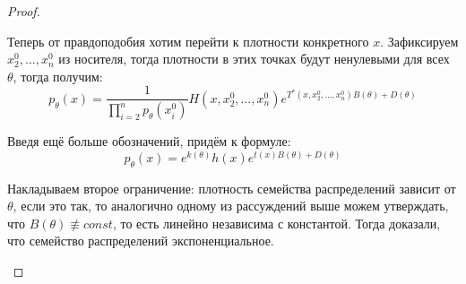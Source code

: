 \begin{proof}
\begin{itemize}
        Теперь от правдоподобия хотим перейти к плотности конкретного $x$. Зафиксируем $x_2^0, \dots, x_n^0$ из носителя, тогда плотности в этих точках будут ненулевыми для всех $\theta$, тогда получим:
        \[
            p_\theta(x) = \frac{1}{\prod_{i=2}^n p_\theta(x_i^0)} H(x, x_2^0, \dots, x_n^0) e^{T^*(x, x_2^0, \dots, x_n^0) B(\theta) + D(\theta)}
        \]

        Введя ещё больше обозначений, придём к формуле:
        \[
            p_\theta(x) = e^{k(\theta)} h(x) e^{t(x) B(\theta) + D(\theta)}
        \]

        Накладываем второе ограничение: плотность семейства распределений зависит от $\theta$, если это так, то аналогично одному из рассуждений выше можем утверждать, что $B(\theta) \not\equiv const$, то есть линейно независима с константой. Тогда доказали, что семейство распределений экспоненциальное.
    \end{itemize}
\end{proof}